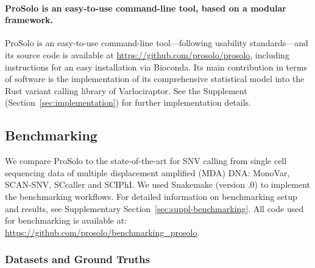 \documentclass[fleqn,12pt,inline]{wlscirep}
\begin{document}
\paragraph{ProSolo is an easy-to-use command-line tool, based on a modular framework.}

ProSolo is an easy-to-use command-line tool---following usability standards\cite{taschuk_ten_2017}---and its source code is available at \url{https://github.com/prosolo/prosolo}, including instructions for an easy installation via Bioconda\cite{gruning_bioconda:_2018}.
Its main contribution in terms of software is the implementation of its comprehensive statistical model into the Rust variant calling library of Varlociraptor\cite{koster_enhancing_2019}.
See the Supplement (Section~\ref{sec:implementation}) for further implementation details.

\subsection{Benchmarking}

We compare ProSolo to the state-of-the-art for SNV calling from single cell sequencing data of multiple displacement amplified (MDA) DNA: MonoVar\cite{zafar_monovar:_2016}, SCAN-SNV\cite{luquette_identification_2019}, SCcaller\cite{dong_accurate_2017} and SCIPhI\cite{singer_single-cell_2018}. We used Snakemake\cite{koster_snakemakescalable_2012} (version {.0}) to implement the benchmarking workflows.
For detailed information on benchmarking setup and results, see Supplementary Section~\ref{sec:suppl-benchmarking}.
All code used for benchmarking is available at: \url{https://github.com/prosolo/benchmarking_prosolo}.

\subsubsection{Datasets and Ground Truths}
\end{document}
